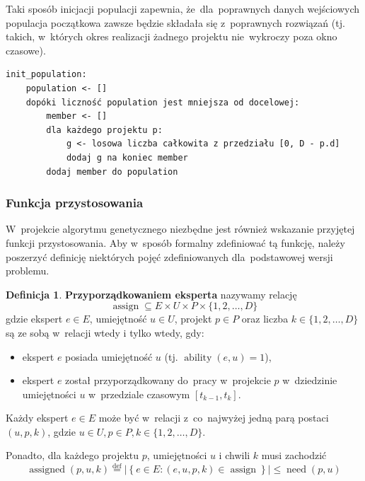 \documentclass[12pt,a4paper]{article}
\theoremstyle{definition}
\newtheorem{defn}{Definicja}
\DeclareMathOperator{\ability}{ability}
\DeclareMathOperator{\need}{need}
\DeclareMathOperator{\assign}{assign}
\DeclareMathOperator{\assigned}{assigned}
\begin{document}
\noindent
Taki sposób inicjacji populacji zapewnia, że~dla~poprawnych danych wejściowych populacja początkowa zawsze będzie składała się z~poprawnych rozwiązań (tj. takich, w~których okres realizacji żadnego projektu nie~wykroczy poza okno
czasowe).\\

\begin{tcolorbox}[title=Losowanie populacji początkowej]
\begin{verbatim}
init_population:
    population <- []
    dopóki liczność population jest mniejsza od docelowej:
        member <- []
        dla każdego projektu p:
            g <- losowa liczba całkowita z przedziału [0, D - p.d]
            dodaj g na koniec member
        dodaj member do population
\end{verbatim}
\end{tcolorbox} 

\subsubsection{Funkcja przystosowania}
W~projekcie algorytmu genetycznego niezbędne jest również wskazanie przyjętej funkcji przystosowania.
Aby w~sposób formalny zdefiniować tą funkcję, należy poszerzyć definicję niektórych pojęć zdefiniowanych dla~podstawowej wersji problemu.

\begin{defn}
\textbf{Przyporządkowaniem eksperta} nazywamy relację
$$ \assign \subseteq E \times U \times P \times \{ 1, 2, \dots, D \} $$
gdzie ekspert $e \in E$, umiejętność $u \in U$, projekt $p \in P$ oraz liczba $k \in \{1, 2, \dots, D\}$ są ze sobą w~relacji wtedy i tylko wtedy, gdy:
\begin{itemize}
	\item ekspert $e$ posiada umiejętność $u$ (tj. $\ability(e, u) = 1$),
	\item ekspert $e$ został przyporządkowany do~pracy w~projekcie $p$ w~dziedzinie umiejętności $u$ w~przedziale czasowym $[t_{k-1}, t_k]$.
\end{itemize}
Każdy ekspert $e \in E$ może być w~relacji z~co~najwyżej jedną parą postaci
$(u,p,k)$, gdzie $u \in U, p \in P, k \in \{1, 2, \dots, D\}$.

\noindent
Ponadto, dla każdego projektu $p$, umiejętności $u$ i chwili $k$ musi zachodzić
$$\assigned(p,u,k) \overset{\text{def}}{=} \left| \left\lbrace e \in E : (e,u,p,k)
\in \assign \right\rbrace \right| \leq \need(p,u)$$
\end{defn}
\end{document}
